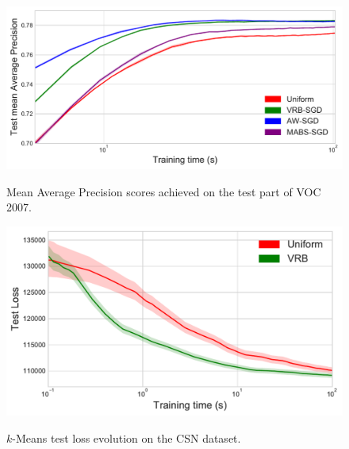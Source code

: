 \begin{figure}[h]
\centering
\begin{minipage}{.48\textwidth}
  \centering
  \includegraphics[width=\linewidth]{figures/voc-result.pdf}
      \caption{Mean Average Precision scores achieved on the test part of VOC 2007.}
      \label{fig:exp1}
\end{minipage}%
\quad
\begin{minipage}{.48\textwidth}
  \centering
  \includegraphics[width=.88\linewidth]{figures/kmeans-csn.pdf}
      \caption{$k$-Means test loss evolution on the CSN dataset.}
      \label{fig:exp2}
\label{fig:exp}
\end{minipage}%
\end{figure}
